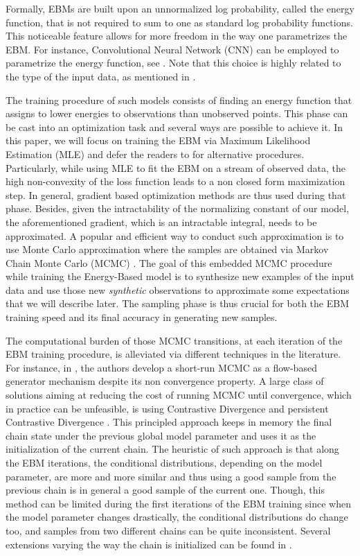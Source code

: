 \documentclass[10pt,twocolumn,letterpaper]{article}
\begin{document}
Formally, EBMs are built upon an unnormalized log probability, called the energy function, that is not required to sum to one as standard log probability functions.
This noticeable feature allows for more freedom in the way one parametrizes the EBM.
For instance, Convolutional Neural Network (CNN) can be employed to parametrize the energy function, see \cite{xie2016theory}.
Note that this choice is highly related to the type of the input data, as mentioned in \cite{song2021train}.

The training procedure of such models consists of finding an energy function that assigns to lower energies to observations than unobserved points.
This phase can be cast into an optimization task and several ways are possible to achieve it.
In this paper, we will focus on training the EBM via Maximum Likelihood Estimation (MLE) and defer the readers to \cite{song2021train} for alternative procedures.
Particularly, while using MLE to fit the EBM on a stream of observed data, the high non-convexity of the loss function leads to a non closed form maximization step. 
In general, gradient based optimization methods are thus used during that phase.
Besides, given the intractability of the normalizing constant of our model, the aforementioned gradient, which is an intractable integral, needs to be approximated.
A popular and efficient way to conduct such approximation is to use Monte Carlo approximation where the samples are obtained via Markov Chain Monte Carlo (MCMC) \cite{meyn2012markov}.
The goal of this embedded MCMC procedure while training the Energy-Based model is to synthesize new examples of the input data and use those new \emph{synthetic} observations to approximate some expectations that we will describe later.
The sampling phase is thus crucial for both the EBM training speed and its final accuracy in generating new samples.

The computational burden of those MCMC transitions, at each iteration of the EBM training procedure, is alleviated via different techniques in the literature.
For instance, in \cite{nijkamp2019learning}, the authors develop a short-run MCMC as a flow-based generator mechanism despite its non convergence property.
A large class of solutions aiming at reducing the cost of running MCMC until convergence, which in practice can be unfeasible, is using Contrastive Divergence \cite{hinton2002training} and persistent Contrastive Divergence \cite{tieleman2008training}.
This principled approach keeps in memory the final chain state under the previous global model parameter and uses it as the initialization of the current chain.
The heuristic of such approach is that along the EBM iterations, the conditional distributions, depending on the model parameter, are more and more similar and thus using a good sample from the previous chain is in general a good sample of the current one.
Though, this method can be limited during the first iterations of the EBM training since when the model parameter changes drastically, the conditional distributions do change too, and samples from two different chains can be quite inconsistent.
Several extensions varying the way the chain is initialized can be found in \cite{welling2002new,gao2018learning,du2019implicit}.
\end{document}
